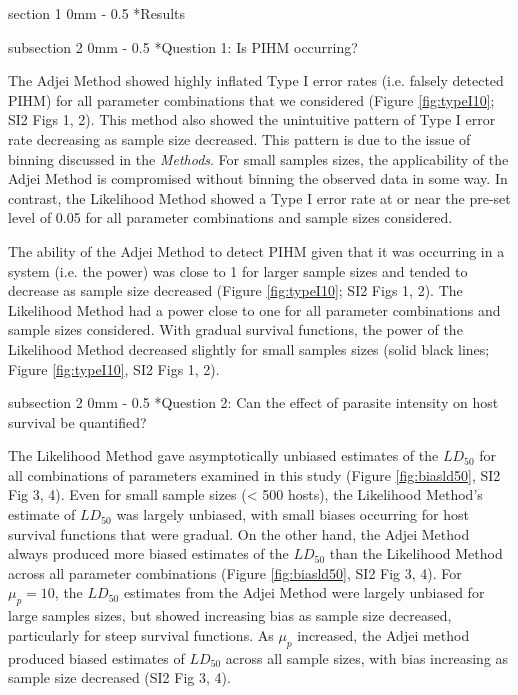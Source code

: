 \documentclass[12pt, a4paper]{article}
\makeatletter
\renewcommand{\section}{\@startsection
{section}%
{1}%
{0mm}%
{-\baselineskip}%
{0.5\baselineskip}%
{\normalfont\bf\large}} %
\renewcommand{\subsection}{\@startsection
{subsection}%
{2}%
{0mm}%
{-\baselineskip}%
{0.5\baselineskip}%
{\normalfont\bf}} %
\makeatother
\begin{document}
\section*{Results}

\subsection*{Question 1: Is PIHM occurring?}

The Adjei Method showed highly inflated Type I error rates (i.e. falsely detected
PIHM) for all parameter combinations that we
considered (Figure \ref{fig:typeI10}; SI2 Figs 1, 2).  This method also showed the unintuitive pattern of Type I error
rate decreasing as sample size decreased.  This pattern is due to the issue of
binning discussed in the \emph{Methods}. For small samples sizes, the
applicability of the Adjei Method is compromised without binning the observed
data in some way.  In contrast, the Likelihood Method showed a Type I
error rate at or near the pre-set level of 0.05 for all parameter combinations
and sample sizes considered.

The ability of the Adjei Method to detect PIHM given that it was occurring in a
system (i.e. the power) was close to 1 for larger sample sizes and tended to
decrease as sample size decreased (Figure \ref{fig:typeI10}; SI2 Figs 1, 2).  The Likelihood Method had a power close to
one for all parameter combinations and sample sizes considered.  With gradual
survival functions, the power of the Likelihood Method decreased slightly for small samples sizes (solid black lines; Figure \ref{fig:typeI10}, SI2 Figs 1, 2).


\subsection*{Question 2: Can the effect of parasite intensity on host survival be quantified?}

The Likelihood Method gave asymptotically unbiased estimates of the $LD_{50}$
for all combinations of parameters examined in this study (Figure \ref{fig:biasld50}, SI2 Fig 3, 4).  Even for
small sample sizes (< 500 hosts), the Likelihood Method's estimate of $LD_{50}$
was largely unbiased, with small biases occurring for host survival functions
that were gradual.  On the other hand, the Adjei Method
always produced more biased estimates of the $LD_{50}$ than the Likelihood
Method across all parameter combinations (Figure \ref{fig:biasld50}, SI2 Fig 3, 4).  For $\mu_p = 10$, the $LD_{50}$
estimates from the Adjei Method were largely unbiased for large samples sizes,
but showed increasing bias as sample size decreased, particularly for steep
survival functions.  As $\mu_p$ increased, the Adjei method
produced biased estimates of $LD_{50}$ across all sample sizes, with bias
increasing as sample size decreased (SI2 Fig 3, 4).
\end{document}
